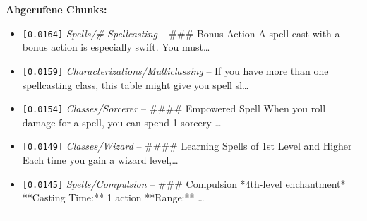 \noindent\textbf{Abgerufene Chunks:}
\begin{itemize}[noitemsep, topsep=2pt]
  \item[\textbf{\#1}] \texttt{[0.0164]} \textit{Spells/# Spellcasting} -- \#\#\# Bonus Action  A spell cast with a bonus action is especially swift. You must\ldots
  \item[\textbf{\#2}] \texttt{[0.0159]} \textit{Characterizations/Multiclassing} -- If you have more than one spellcasting class, this table might give you spell sl\ldots
  \item[\textbf{\#3}] \texttt{[0.0154]} \textit{Classes/Sorcerer} -- \#\#\#\# Empowered Spell  When you roll damage for a spell, you can spend 1 sorcery \ldots
  \item[\textbf{\#4}] \texttt{[0.0149]} \textit{Classes/Wizard} -- \#\#\#\# Learning Spells of 1st Level and Higher  Each time you gain a wizard level,\ldots
  \item[\textbf{\#5}] \texttt{[0.0145]} \textit{Spells/Compulsion} -- \#\#\# Compulsion  *4th-level enchantment*  **Casting Time:** 1 action  **Range:** \ldots
\end{itemize}
\vspace{4pt}
\hrule
\vspace{6pt}
